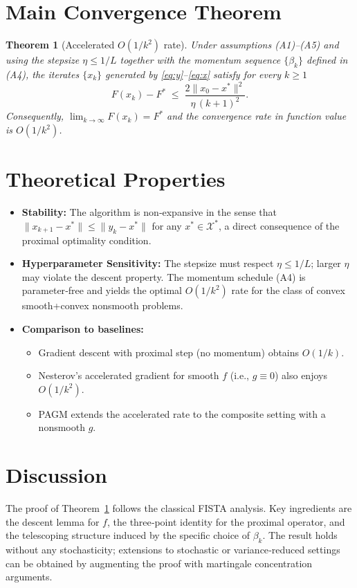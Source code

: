 \documentclass{article}
\newtheorem{theorem}{Theorem}
\begin{document}
\section*{Main Convergence Theorem}
\begin{theorem}[Accelerated $O(1/k^{2})$ rate]\label{thm:rate}
Under assumptions (A1)–(A5) and using the stepsize $\eta\le1/L$ together with the momentum
sequence $\{\beta_k\}$ defined in (A4), the iterates $\{x_k\}$ generated by
\eqref{eq:y}–\eqref{eq:x} satisfy for every $k\ge1$
\[
F(x_k)-F^{*}\;\le\;\frac{2\|x_{0}-x^{*}\|^{2}}{\eta\, (k+1)^{2}} .
\tag{1}
\]
Consequently, $\displaystyle\lim_{k\to\infty}F(x_k)=F^{*}$ and the convergence
rate in function value is $O(1/k^{2})$.
\end{theorem}

\section*{Theoretical Properties}
\begin{itemize}
\item \textbf{Stability:} The algorithm is non‑expansive in the sense that
$\|x_{k+1}-x^{*}\|\le\|y_k-x^{*}\|$ for any $x^{*}\in\mathcal{X}^{*}$, a direct consequence of the proximal optimality condition.
\item \textbf{Hyperparameter Sensitivity:} The stepsize must respect $\eta\le1/L$;
larger $\eta$ may violate the descent property. The momentum schedule (A4) is
parameter‑free and yields the optimal $O(1/k^{2})$ rate for the class of convex
smooth+convex nonsmooth problems.
\item \textbf{Comparison to baselines:}
\begin{itemize}
\item Gradient descent with proximal step (no momentum) obtains $O(1/k)$.
\item Nesterov’s accelerated gradient for smooth $f$ (i.e., $g\equiv0$) also enjoys $O(1/k^{2})$.
\item PAGM extends the accelerated rate to the composite setting with a nonsmooth $g$.
\end{itemize}
\end{itemize}

\section*{Discussion}
The proof of Theorem~\ref{thm:rate} follows the classical FISTA analysis.
Key ingredients are the descent lemma for $f$, the three‑point identity for the
proximal operator, and the telescoping structure induced by the specific choice
of $\beta_k$. The result holds without any stochasticity; extensions to
stochastic or variance‑reduced settings can be obtained by augmenting the proof
with martingale concentration arguments.
\end{document}
